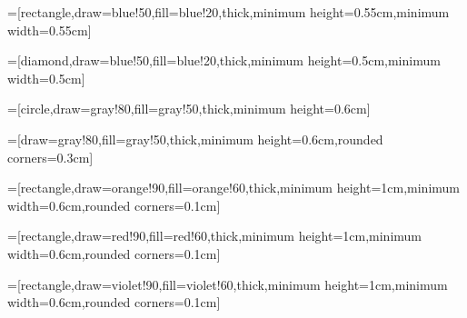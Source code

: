 \usepackage{tikz}
\usepackage{pgfplots}
\pgfplotsset{compat=1.7}

\usetikzlibrary{arrows,calc,shapes,decorations.pathreplacing,calligraphy}
\tikzset{>=latex}
	

	
=[rectangle,draw=blue!50,fill=blue!20,thick,minimum height=0.55cm,minimum width=0.55cm]

=[diamond,draw=blue!50,fill=blue!20,thick,minimum height=0.5cm,minimum width=0.5cm]

=[circle,draw=gray!80,fill=gray!50,thick,minimum height=0.6cm]

=[draw=gray!80,fill=gray!50,thick,minimum height=0.6cm,rounded corners=0.3cm]
 
=[rectangle,draw=orange!90,fill=orange!60,thick,minimum height=1cm,minimum width=0.6cm,rounded corners=0.1cm]

=[rectangle,draw=red!90,fill=red!60,thick,minimum height=1cm,minimum width=0.6cm,rounded corners=0.1cm]

=[rectangle,draw=violet!90,fill=violet!60,thick,minimum height=1cm,minimum width=0.6cm,rounded corners=0.1cm]




\newcommand{\Left}[3]{
 	\pgfmathparse{#1 + #3}
 	\node[tensor] (tens) at (#1 , #2) {};
	\node (d1) at (\pgfmathresult , #2 + 1.5) {};
 	\node (d2) at (\pgfmathresult , #2 - 1.5) {};
 	\node (d3) at (\pgfmathresult , #2) {};    
    
    \draw[-] (d1.west) .. controls (#1, #2 + 1.5) .. (tens.north);
    \draw[-] (d2.west) .. controls (#1, #2 - 1.5) .. (tens.south);
	\draw[-] (tens) -- (d3);
}

\newcommand{\Right}[3]{
 	\pgfmathparse{#1 - #3}
 	\node[tensor] (tens) at (#1 , #2) {};
	\node (d1) at (\pgfmathresult , #2 + 1.5) {};
 	\node (d2) at (\pgfmathresult , #2 - 1.5) {};
 	\node (d3) at (\pgfmathresult , #2) {};    
    
    \draw[-] (d1.east) .. controls (#1, #2 + 1.5) .. (tens.north);
    \draw[-] (d2.east) .. controls (#1, #2 - 1.5) .. (tens.south);
	\draw[-] (tens) -- (d3);
}

\newcommand{\SVD}[3]{
 	\node[tensor] (U) at (#1 , #2) {};
	\node (Ulabel) at (#1 , #2 + 0.6) {$U$};
	\draw[-] (U) -- (#1 -0.8, #2);
	\draw[-] (U) -- (#1 , #2 - 0.8); 	
 	
 	\node[matrix] (S) at (#1 + #3, #2) {};
 	\node (Slabel) at (#1 + #3 , #2 + 0.6) {$S$};	
 	
 	\node[tensor] (V) at (#1 + #3 *2 , #2) {};
 	\node (Vlabel) at (#1 + #3 *2 , #2 + 0.6) {$V^{\dag}$};
 	\draw[-] (V) -- (#1 + #3 *2 +0.8, #2);
	\draw[-] (V) -- (#1 + #3 *2 , #2 - 0.8);
	
	\draw[-] (U) -- (S);
	\draw[-] (V) -- (S);
}

